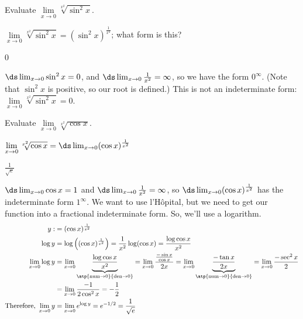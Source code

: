 \begin{Mquestion}\label{lhopB}
Evaluate $\lim\limits_{x \to 0}\sqrt[x^2]{\sin^2 x}$.
\end{Mquestion}
\begin{hint} $\lim\limits_{x \to 0}\sqrt[x^2]{\sin^2 x}=(\sin^2 x)^{\frac{1}{x^2}}$; what form is this?
\end{hint}
\begin{answer} 0
\end{answer}
\begin{solution} $\ds\lim_{x \to 0} \sin^2 x = 0$, and $\ds\lim_{x \to 0}\frac{1}{x^2}=\infty$, so we have the form $0^\infty$. (Note that $\sin^2 x$ is positive, so our root is defined.) This is not an indeterminate form: $\lim\limits_{x \to 0}\sqrt[x^2]{\sin^2 x}=0$.
\end{solution}


\begin{Mquestion}\label{lhopC}
Evaluate $\lim\limits_{x \to 0}\sqrt[x^2]{\cos x}$.
\end{Mquestion}
\begin{hint} $\lim\limits_{x \to 0}\sqrt[x^2]{\cos x} = \ds\lim_{x \to 0}(\cos x)^{\frac{1}{x^2}}$
\end{hint}
\begin{answer} $\frac{1}{\sqrt{e}}$
\end{answer}
\begin{solution} $\ds\lim_{x \to 0} \cos x =1$ and $\ds\lim_{x \to 0}\frac{1}{x^2}=\infty$, so $\ds\lim_{x \to 0}(\cos x)^{\frac{1}{x^2}}$ has the indeterminate form $1^\infty$. We want to use l'H\^opital, but we need to get our function into a fractional indeterminate form. So, we'll use a logarithm.
\begin{align*}
y:&=(\cos x)^{\frac{1}{x^2}}\\
\log y &= \log \left((\cos x)^{\frac{1}{x^2}}\right)=\frac{1}{x^2}\log(\cos x)=\frac{\log \cos x}{x^2}\\
\lim_{x \to 0}\log y &=\lim_{x \to 0}\underbrace{\frac{\log \cos x}{x^2}}_{\atp
	{\mathrm{num}\to0}
	{\mathrm{den}\to 0}}
	=
	\lim_{x \to 0} \frac{\frac{-\sin x}{\cos x}}{2x}=
	\lim_{x \to 0} \underbrace{\frac{-\tan x}{2x}}_{\atp
	{\mathrm{num}\to0}
	{\mathrm{den}\to 0}}
	=
	\lim_{x \to 0}\frac{-\sec^2x}{2}\\
	&=\lim_{x \to 0}\frac{-1}{2\cos^2 x}=-\frac{1}{2}\\
\mbox{Therefore, } \lim_{x \to 0} y &=\lim_{x \to 0}e^{\log y}=e^{-1/2}=\frac{1}{\sqrt{e}}
\end{align*}
\end{solution}


